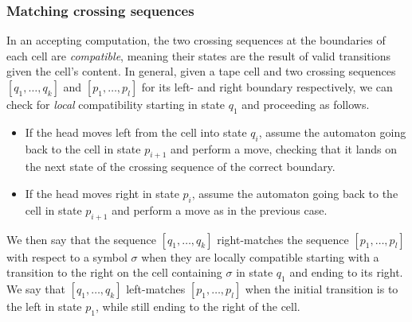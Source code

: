\subsubsection{Matching crossing sequences}
In an accepting computation, the two crossing sequences at the boundaries of each cell are \emph{compatible}, meaning their states are the result of valid transitions given the cell's content.
In general, given a tape cell and two crossing sequences $[q_1,\dots,q_k]$ and $[p_1,\dots,p_l]$ for its left- and right boundary respectively, we can check for \emph{local} compatibility starting in state $q_1$ and proceeding as follows.
\begin{itemize}
	\item If the head moves left from the cell into state $q_i$, assume the automaton going back to the cell in state $p_{i+1}$ and perform a move, checking that it lands on the next state of the crossing sequence of the correct boundary.
	\item If the head moves right in state $p_i$, assume the automaton going back to the cell in state $p_{i+1}$ and perform a move as in the previous case.
\end{itemize}

We then say that the sequence $[q_1,\dots,q_k]$ right-matches the sequence $[p_1,\dots,p_l]$ with respect to a symbol $\sigma$ when they are locally compatible starting with a transition to the right on the cell containing $\sigma$ in state $q_1$ and ending to its right.
We say that $[q_1,\dots,q_k]$ left-matches $[p_1,\dots,p_l]$ when the initial transition is to the left in state $p_1$, while still ending to the right of the cell.

